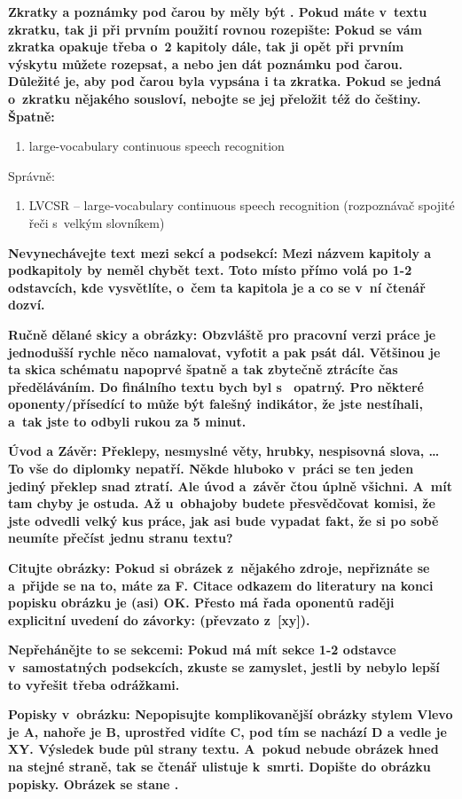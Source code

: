 \bf Zkratky a poznámky pod čarou by měly být . Pokud máte v~textu zkratku, tak ji při prvním použití rovnou rozepište: \rm Pokud se vám zkratka opakuje třeba o~2 kapitoly dále, tak ji opět při prvním výskytu můžete rozepsat, a nebo jen dát poznámku pod čarou. Důležité je, aby pod čarou byla vypsána i ta zkratka. Pokud se jedná o~zkratku nějakého  sousloví, nebojte se jej přeložit též do češtiny.
Špatně:
\begin{enumerate}
  \item{large-vocabulary continuous speech recognition}
\end{enumerate}
Správně:
\begin{enumerate}
  \item{LVCSR -- large-vocabulary continuous speech recognition (rozpoznávač spojité řeči s~velkým slovníkem)}
\end{enumerate}

\bf Nevynechávejte text mezi sekcí a podsekcí: \rm Mezi názvem kapitoly a podkapitoly by neměl chybět text. Toto místo přímo volá po 1-2 odstavcích, kde vysvětlíte, o~čem ta kapitola je a co se v~ní čtenář dozví.

\bf Ručně dělané skicy a obrázky: \rm Obzvláště pro pracovní verzi práce je jednodušší rychle něco namalovat, vyfotit a pak psát dál. Většinou je ta skica schématu napoprvé špatně a tak zbytečně ztrácíte čas předěláváním. Do finálního textu bych byl s~ opatrný. Pro některé oponenty/přísedící to může být falešný indikátor, že jste nestíhali, a~tak jste to odbyli rukou za 5 minut.

\bf Úvod a Závěr: \rm Překlepy, nesmyslné věty, hrubky, nespisovná slova, \ldots  To vše do diplomky nepatří. Někde hluboko v~práci se ten jeden jediný překlep snad ztratí. Ale úvod a~závěr čtou úplně všichni. A~mít tam chyby je ostuda. Až u~obhajoby budete přesvědčovat komisi, že jste odvedli velký kus práce, jak asi bude vypadat fakt, že si po sobě neumíte přečíst jednu stranu textu?

\bf Citujte obrázky: \rm Pokud si  obrázek z~nějakého zdroje, nepřiznáte se a~přijde se na to, máte za F. Citace odkazem do literatury na konci popisku obrázku je (asi) OK. Přesto má řada oponentů raději explicitní uvedení do závorky: (převzato z~[xy]).

\bf Nepřehánějte to se sekcemi: \rm Pokud má mít sekce 1-2 odstavce v~samostatných podsekcích, zkuste se zamyslet, jestli by nebylo lepší to vyřešit třeba odrážkami.

\bf Popisky v~obrázku: \rm Nepopisujte komplikovanější obrázky stylem Vlevo je A, nahoře je B, uprostřed vidíte C, pod tím se nachází D a vedle je XY. Výsledek bude půl strany textu. A~pokud nebude obrázek hned na stejné straně, tak se čtenář ulistuje k~smrti. Dopište do obrázku popisky. Obrázek se stane .

